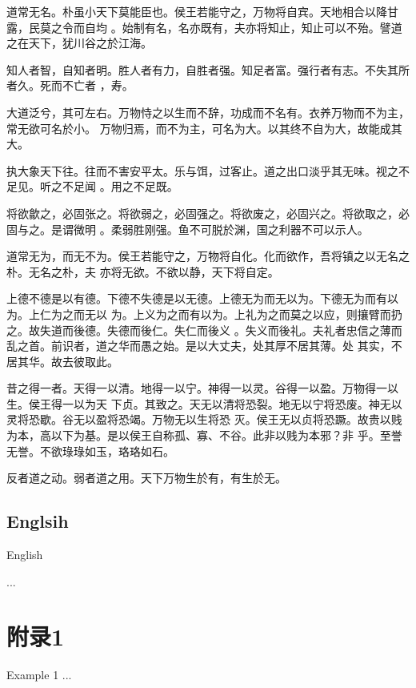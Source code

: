 \documentclass[a4paper, twoside, openany, extrafontsizes]{dlutthesis}
\begin{document}
道常无名。朴虽小天下莫能臣也。侯王若能守之，万物将自宾。天地相合以降甘露，民莫之令而自均
。始制有名，名亦既有，夫亦将知止，知止可以不殆。譬道之在天下，犹川谷之於江海。

知人者智，自知者明。胜人者有力，自胜者强。知足者富。强行者有志。不失其所者久。死而不亡者
，寿。

大道泛兮，其可左右。万物恃之以生而不辞，功成而不名有。衣养万物而不为主，常无欲可名於小。
万物归焉，而不为主，可名为大。以其终不自为大，故能成其大。

执大象天下往。往而不害安平太。乐与饵，过客止。道之出口淡乎其无味。视之不足见。听之不足闻
。用之不足既。

将欲歙之，必固张之。将欲弱之，必固强之。将欲废之，必固兴之。将欲取之，必固与之。是谓微明
。柔弱胜刚强。鱼不可脱於渊，国之利器不可以示人。

道常无为，而无不为。侯王若能守之，万物将自化。化而欲作，吾将镇之以无名之朴。无名之朴，夫
亦将无欲。不欲以静，天下将自定。

上德不德是以有德。下德不失德是以无德。上德无为而无以为。下德无为而有以为。上仁为之而无以
为。上义为之而有以为。上礼为之而莫之以应，则攘臂而扔之。故失道而後德。失德而後仁。失仁而後义
。失义而後礼。夫礼者忠信之薄而乱之首。前识者，道之华而愚之始。是以大丈夫，处其厚不居其薄。处
其实，不居其华。故去彼取此。

昔之得一者。天得一以清。地得一以宁。神得一以灵。谷得一以盈。万物得一以生。侯王得一以为天
下贞。其致之。天无以清将恐裂。地无以宁将恐废。神无以灵将恐歇。谷无以盈将恐竭。万物无以生将恐
灭。侯王无以贞将恐蹶。故贵以贱为本，高以下为基。是以侯王自称孤、寡、不谷。此非以贱为本邪？非
乎。至誉无誉。不欲琭琭如玉，珞珞如石。

反者道之动。弱者道之用。天下万物生於有，有生於无。

\section{Englsih}{English}
\label{sec:englsih}

\lipsum[1-9]


\printpagenotes

\begin{thebibliography}
	...
\end{thebibliography}

\appendix
\chapter{附录1}{Example 1}
...

\backmatter
\end{document}

